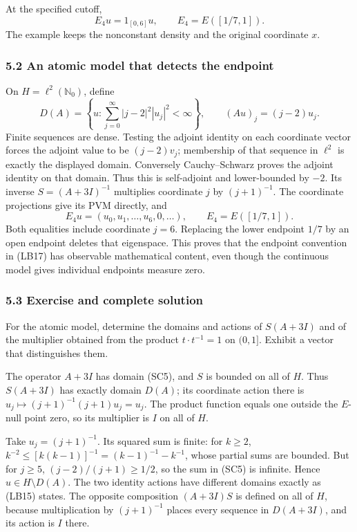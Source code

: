 \documentclass[
  11pt,
]{article}
\begin{document}
At the specified cutoff, \[
 E_4u=1_{[0,6]}u,\qquad E_4=E([1/7,1]).
 \tag{SC4}
\] The example keeps the nonconstant density and the original coordinate
\(x\).

\subsubsection{5.2 An atomic model that detects the
endpoint}\label{an-atomic-model-that-detects-the-endpoint}

On \(H=\ell^2(\mathbb N_0)\), define \[
 D(A)=\left\{u:\sum_{j=0}^\infty|j-2|^2|u_j|^2<\infty\right\},
 \qquad(Au)_j=(j-2)u_j.
 \tag{SC5}
\] Finite sequences are dense. Testing the adjoint identity on each
coordinate vector forces the adjoint value to be \((j-2)v_j\);
membership of that sequence in \(\ell^2\) is exactly the displayed
domain. Conversely Cauchy--Schwarz proves the adjoint identity on that
domain. Thus this is self-adjoint and lower-bounded by \(-2\). Its
inverse \(S=(A+3I)^{-1}\) multiplies coordinate \(j\) by \((j+1)^{-1}\).
The coordinate projections give its PVM directly, and \[
 E_4u=(u_0,u_1,\ldots,u_6,0,\ldots),\qquad
 E_4=E([1/7,1]).
 \tag{SC6}
\] Both equalities include coordinate \(j=6\). Replacing the lower
endpoint \(1/7\) by an open endpoint deletes that eigenspace. This
proves that the endpoint convention in (LB17) has observable
mathematical content, even though the continuous model gives individual
endpoints measure zero.

\subsubsection{5.3 Exercise and complete
solution}\label{exercise-and-complete-solution}

For the atomic model, determine the domains and actions of \(S(A+3I)\)
and of the multiplier obtained from the product \(t\cdot t^{-1}=1\) on
\((0,1]\). Exhibit a vector that distinguishes them.

The operator \(A+3I\) has domain (SC5), and \(S\) is bounded on all of
\(H\). Thus \(S(A+3I)\) has exactly domain \(D(A)\); its coordinate
action there is \(u_j\mapsto(j+1)^{-1}(j+1)u_j=u_j\). The product
function equals one outside the \(E\)-null point zero, so its multiplier
is \(I\) on all of \(H\).

Take \(u_j=(j+1)^{-1}\). Its squared sum is finite: for \(k\geq2\),
\(k^{-2}\leq[k(k-1)]^{-1}=(k-1)^{-1}-k^{-1}\), whose partial sums are
bounded. But for \(j\geq5\), \((j-2)/(j+1)\geq1/2\), so the sum in (SC5)
is infinite. Hence \(u\in H\setminus D(A)\). The two identity actions
have different domains exactly as (LB15) states. The opposite
composition \((A+3I)S\) is defined on all of \(H\), because
multiplication by \((j+1)^{-1}\) places every sequence in \(D(A+3I)\),
and its action is \(I\) there.
\end{document}
